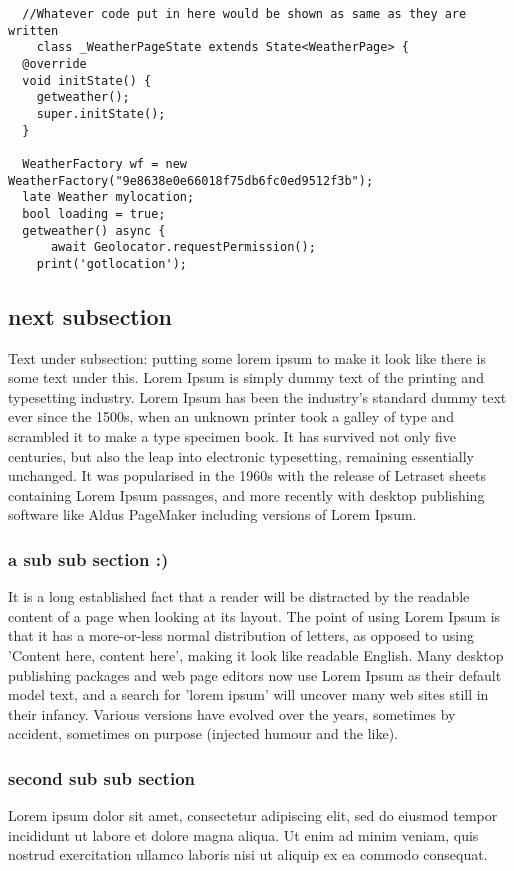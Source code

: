 \documentclass{article}     %
\begin{document}
\begin{verbatim}
  //Whatever code put in here would be shown as same as they are written
    class _WeatherPageState extends State<WeatherPage> {
  @override
  void initState() {
    getweather();
    super.initState();
  }

  WeatherFactory wf = new WeatherFactory("9e8638e0e66018f75db6fc0ed9512f3b");
  late Weather mylocation;
  bool loading = true;
  getweather() async {
      await Geolocator.requestPermission();
    print('gotlocation');
\end{verbatim}
\subsection{next subsection}
Text under subsection:  
putting some lorem ipsum to make it look like there is some text under this. 
Lorem Ipsum is simply dummy text of the printing and typesetting industry. 
Lorem Ipsum has been the industry's standard dummy text ever since the 1500s, 
when an unknown printer took a galley of type and scrambled it to make a type 
specimen book. It has survived not only five centuries, but also the leap into 
electronic typesetting, remaining essentially unchanged. It was popularised in 
the 1960s with the release of Letraset sheets containing Lorem Ipsum passages, 
and more recently with desktop publishing software like Aldus PageMaker 
including versions of Lorem Ipsum.
\subsubsection{a sub sub section :)}

It is a long established fact that a reader will be distracted by the readable 
content of a page when looking at its layout. The point of using Lorem Ipsum is
 that it has a more-or-less normal distribution of letters, as opposed to using 
 'Content here, content here', making it look like readable English. 
 Many desktop publishing packages and web page editors now use Lorem Ipsum as 
 their default model text, and a search for 'lorem ipsum' will uncover many 
 web sites still in their infancy. Various versions have evolved over the years, 
 sometimes by accident, sometimes on purpose (injected humour and the like).
 \subsubsection{second sub sub section}

 Lorem ipsum dolor sit amet, consectetur adipiscing elit, sed do eiusmod tempor 
 incididunt ut labore et dolore magna aliqua. Ut enim ad minim veniam, quis 
 nostrud exercitation ullamco laboris nisi ut aliquip ex ea commodo consequat.
\end{document}
